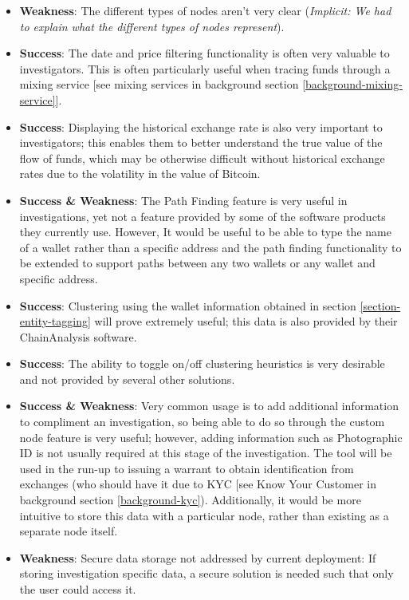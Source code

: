 \begin{itemize}
    \item \textbf{Weakness}: The different types of nodes aren't very clear (\textit{Implicit: We had to explain what the different types of nodes represent}).
    \item \textbf{Success}: The date and price filtering functionality is often very valuable to investigators. This is often particularly useful when tracing funds through a mixing service [see mixing services in background section \ref{background-mixing-service}]. 
    \item \textbf{Success}: Displaying the historical exchange rate is also very important to investigators; this enables them to better understand the true value of the flow of funds, which may be otherwise difficult without historical exchange rates due to the volatility in the value of Bitcoin. 
    \item \textbf{Success \& Weakness}: The Path Finding feature is very useful in investigations, yet not a feature provided by some of the software products they currently use. However, It would be useful to be able to type the name of a wallet rather than a specific address and the path finding functionality to be extended to support paths between any two wallets or any wallet and specific address.
    \item \textbf{Success}: Clustering using the wallet information obtained in section \ref{section-entity-tagging} will prove extremely useful; this data is also provided by their ChainAnalysis software. 
    \item \textbf{Success}: The ability to toggle on/off clustering heuristics is very desirable and not provided by several other solutions. 
    \item \textbf{Success \& Weakness}: Very common usage is to add additional information to compliment an investigation, so being able to do so through the custom node feature is very useful; however, adding information such as Photographic ID is not usually required at this stage of the investigation. The tool will be used in the run-up to issuing a warrant to obtain identification from exchanges (who should have it due to KYC [see Know Your Customer in background section \ref{background-kyc}). Additionally, it would be more intuitive to store this data with a particular node, rather than existing as a separate node itself. 
    \item \textbf{Weakness}: Secure data storage not addressed by current deployment: If storing investigation specific data, a secure solution is needed such that only the user could access it. 
\end{itemize}

